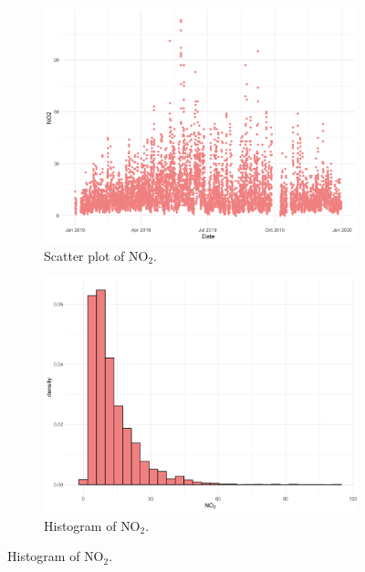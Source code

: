 \documentclass[a4paper, 10pt]{article}
\begin{document}
         \begin{figure}[H]
            \centering
            \begin{subfigure}[t]{0.48\linewidth}
               \centering
               \includegraphics[width=\linewidth]{../images/no2_scatter_2019.png}
               \caption{Scatter plot of $\text{NO}_{2}$.}
            \end{subfigure}
            \hfill
            \begin{subfigure}[t]{0.48\linewidth}
               \centering
               \includegraphics[width=\linewidth]{../images/no2_hist_2019.png}
               \caption{Histogram of $\text{NO}_{2}$.}
            \end{subfigure}
         \end{figure}
\end{document}
